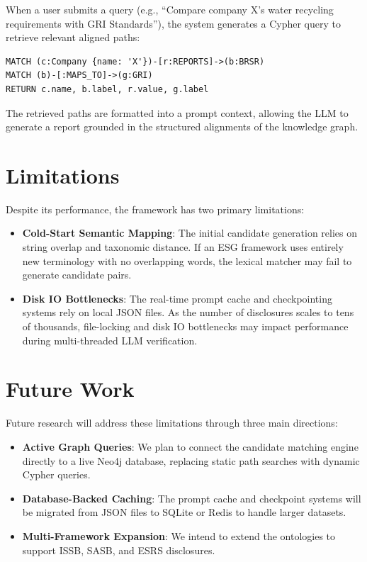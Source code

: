 \documentclass[journal,compsoc]{IEEEtran}
\begin{document}
\begin{table}[t]
When a user submits a query (e.g., ``Compare company X's water recycling requirements with GRI Standards''), the system generates a Cypher query to retrieve relevant aligned paths:
\begin{verbatim}
MATCH (c:Company {name: 'X'})-[r:REPORTS]->(b:BRSR)
MATCH (b)-[:MAPS_TO]->(g:GRI)
RETURN c.name, b.label, r.value, g.label
\end{verbatim}
The retrieved paths are formatted into a prompt context, allowing the LLM to generate a report grounded in the structured alignments of the knowledge graph.

\section{Limitations}
Despite its performance, the framework has two primary limitations:
\begin{itemize}
    \item \textbf{Cold-Start Semantic Mapping}: The initial candidate generation relies on string overlap and taxonomic distance. If an ESG framework uses entirely new terminology with no overlapping words, the lexical matcher may fail to generate candidate pairs.
    \item \textbf{Disk IO Bottlenecks}: The real-time prompt cache and checkpointing systems rely on local JSON files. As the number of disclosures scales to tens of thousands, file-locking and disk IO bottlenecks may impact performance during multi-threaded LLM verification.
\end{itemize}

\section{Future Work}
Future research will address these limitations through three main directions:
\begin{itemize}
    \item \textbf{Active Graph Queries}: We plan to connect the candidate matching engine directly to a live Neo4j database, replacing static path searches with dynamic Cypher queries.
    \item \textbf{Database-Backed Caching}: The prompt cache and checkpoint systems will be migrated from JSON files to SQLite or Redis to handle larger datasets.
    \item \textbf{Multi-Framework Expansion}: We intend to extend the ontologies to support ISSB, SASB, and ESRS disclosures.
\end{itemize}


\end{table}
\end{document}
